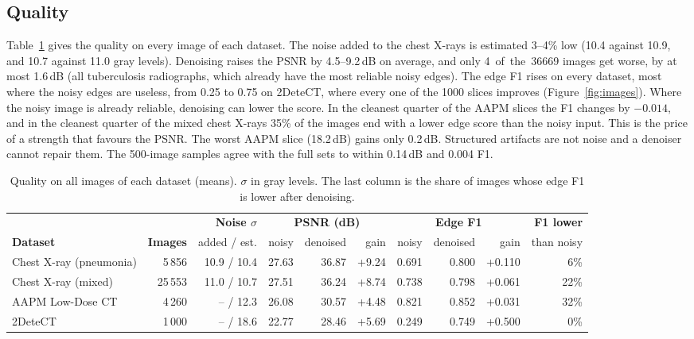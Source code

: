 \documentclass[10pt,a4paper]{article}
\begin{document}
\subsection{Quality}
Table~\ref{tab:quality} gives the quality on every image of each dataset. The noise added to the chest X-rays is estimated
3--4\% low (10.4 against 10.9, and 10.7 against 11.0 gray levels). Denoising raises the PSNR by 4.5--9.2\,dB on average,
and only \mbox{4 of the \num{36669}} images get worse, by at most 1.6\,dB (all tuberculosis radiographs, which already have
the most reliable noisy edges). The edge F1 rises on every dataset, most where the noisy edges are useless, from 0.25 to
0.75 on 2DeteCT, where every one of the \num{1000} slices improves (Figure~\ref{fig:images}). Where the noisy image is
already reliable, denoising can lower the score. In the cleanest quarter of the AAPM slices the F1 changes by $-0.014$,
and in the cleanest quarter of the mixed chest X-rays 35\% of the images end with a lower edge score than the noisy input.
This is the price of a strength that favours the PSNR. The worst AAPM slice (18.2\,dB) gains only 0.2\,dB. Structured
artifacts are not noise and a denoiser cannot repair them. The 500-image samples agree with the full sets to within
0.14\,dB and 0.004 F1.

\begin{table}[H]
	\centering\footnotesize
	\setlength{\tabcolsep}{5pt}
	\begin{tabular}{lrrrrrrrrr}
		\toprule
		& & \textbf{Noise $\sigma$} & \multicolumn{3}{c}{\textbf{PSNR (dB)}} & \multicolumn{3}{c}{\textbf{Edge F1}} & \textbf{F1 lower}\\
		\cmidrule(lr){4-6}\cmidrule(lr){7-9}
		\textbf{Dataset} & \textbf{Images} & added / est. & noisy & denoised & gain & noisy & denoised & gain & than noisy\\
		\midrule
		Chest X-ray (pneumonia) & 5\,856 & 10.9 / 10.4 & 27.63 & 36.87 & +9.24 & 0.691 & 0.800 & +0.110 & 6\% \\
		Chest X-ray (mixed) & 25\,553 & 11.0 / 10.7 & 27.51 & 36.24 & +8.74 & 0.738 & 0.798 & +0.061 & 22\% \\
		AAPM Low-Dose CT & 4\,260 & -- / 12.3 & 26.08 & 30.57 & +4.48 & 0.821 & 0.852 & +0.031 & 32\% \\
		2DeteCT & 1\,000 & -- / 18.6 & 22.77 & 28.46 & +5.69 & 0.249 & 0.749 & +0.500 & 0\% \\
		\bottomrule
	\end{tabular}
	\caption{Quality on all images of each dataset (means). $\sigma$ in gray levels. The last column is the share of images whose edge F1 is lower after denoising.}
	\label{tab:quality}
\end{table}
\end{document}
